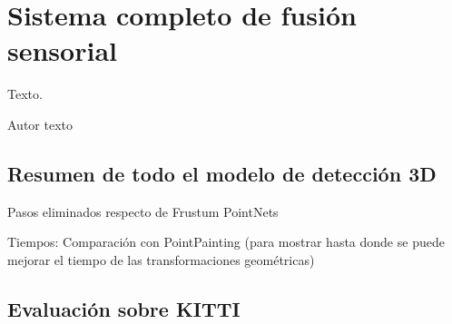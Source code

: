 \chapter{Sistema completo de fusión sensorial}
\label{cha:Sistema completo de fusión sensorial}

\begin{FraseCelebre}
  \begin{Frase}
    Texto.
  \end{Frase}
  \begin{Fuente}
    Autor texto
  \end{Fuente}
\end{FraseCelebre}

\section{Resumen de todo el modelo de detección 3D}
\label{sec:Resumen de todo el modelo de detección 3D}

Pasos eliminados respecto de  Frustum PointNets

Tiempos: Comparación con PointPainting (para mostrar hasta donde se puede mejorar el tiempo de las transformaciones geométricas)

\section{Evaluación sobre KITTI}
\label{sec:Evaluación sobre KITTI}

